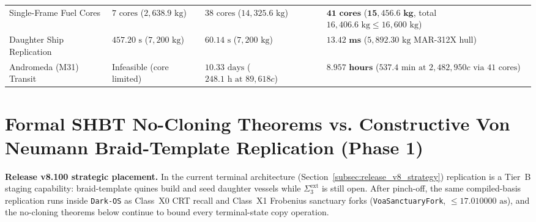 \documentclass[11pt,onecolumn]{article}
\begin{document}
\begin{table}[!htbp]
{\begin{tabular}{@{}llll@{}}
Single-Frame Fuel Cores & $7\text{ cores}$ ($2{,}638.9\text{ kg}$) & $38\text{ cores}$ ($14{,}325.6\text{ kg}$) & $\mathbf{41\text{ cores}}$ ($\mathbf{15{,}456.6\text{ kg}}$, total $16{,}406.6\text{ kg} \le 16{,}600\text{ kg}$) \\
Daughter Ship Replication & $457.20\text{ s}$ ($7{,}200\text{ kg}$) & $60.14\text{ s}$ ($7{,}200\text{ kg}$) & $\mathbf{13.42\text{ ms}}$ ($5{,}892.30\text{ kg}$ MAR-312X hull) \\
Andromeda (M31) Transit & Infeasible (core limited) & $10.33\text{ days}$ ($248.1\text{ h at } 89{,}618c$) & $\mathbf{8.957\text{ hours}}$ ($537.4\text{ min at } 2{,}482{,}950c\text{ via } 41\text{ cores}$) \\
\bottomrule
\end{tabular}%
}
\end{table}
\FloatBarrier
\section{Formal SHBT No-Cloning Theorems vs. Constructive Von Neumann Braid-Template Replication (Phase 1)}

\noindent\textbf{Release v8.100 strategic placement.} In the current terminal architecture (Section~\ref{subsec:release_v8_strategy}) replication is a Tier~B staging capability: braid-template quines build and seed daughter vessels while $\Sigma_3^{\text{ext}}$ is still open. After pinch-off, the same compiled-basis replication runs inside \texttt{Dark-OS} as Class~X0 CRT recall and Class~X1 Frobenius sanctuary forks (\texttt{VoaSanctuaryFork}, $\le17.010000\text{ as}$), and the no-cloning theorems below continue to bound every terminal-state copy operation.
\end{document}
